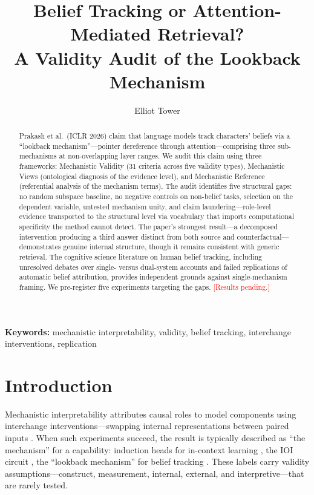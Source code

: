 \documentclass[11pt]{article}
\title{Belief Tracking or Attention-Mediated Retrieval?\\A Validity Audit of the Lookback Mechanism}
\author{Elliot Tower}
\affil{Independent Researcher \\ \texttt{elliot@elliottower.ai}}
\begin{document}
\linenumbers
\maketitle

\begin{abstract}
Prakash et al.\ (ICLR 2026) claim that language models track characters' beliefs via a ``lookback mechanism''---pointer dereference through attention---comprising three sub-mechanisms at non-overlapping layer ranges. We audit this claim using three frameworks: Mechanistic Validity (31 criteria across five validity types), Mechanistic Views (ontological diagnosis of the evidence level), and Mechanistic Reference (referential analysis of the mechanism terms). The audit identifies five structural gaps: no random subspace baseline, no negative controls on non-belief tasks, selection on the dependent variable, untested mechanism unity, and claim laundering---role-level evidence transported to the structural level via vocabulary that imports computational specificity the method cannot detect. The paper's strongest result---a decomposed intervention producing a third answer distinct from both source and counterfactual---demonstrates genuine internal structure, though it remains consistent with generic retrieval. The cognitive science literature on human belief tracking, including unresolved debates over single- versus dual-system accounts and failed replications of automatic belief attribution, provides independent grounds against single-mechanism framing. We pre-register five experiments targeting the gaps. \textcolor{red}{[Results pending.]}
\end{abstract}

\noindent\textbf{Keywords:} mechanistic interpretability, validity, belief tracking, interchange interventions, replication


\section{Introduction}
\label{sec:intro}

Mechanistic interpretability attributes causal roles to model components using interchange interventions---swapping internal representations between paired inputs \citep{geiger2021causal, vig2020investigating}. When such experiments succeed, the result is typically described as ``the mechanism'' for a capability: induction heads for in-context learning \citep{olsson2022context}, the IOI circuit \citep{wang2023interpretability}, the ``lookback mechanism'' for belief tracking \citep{prakash2025lookback}. These labels carry validity assumptions---construct, measurement, internal, external, and interpretive---that are rarely tested.
\end{document}
